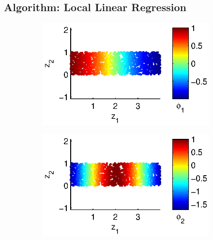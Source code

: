 \documentclass[preprint]{elsarticle}
\begin{document}
\subsection{Algorithm: Local Linear Regression}

\begin{figure}[t]
\begin{subfigure}{0.5\textwidth}
\includegraphics[width=\textwidth]{strip_discrete1}
\end{subfigure}
\begin{subfigure}{0.5\textwidth}
\includegraphics[width=\textwidth]{strip_discrete2}
\end{subfigure}


\end{figure}
\end{document}

